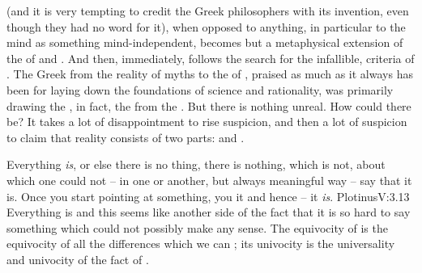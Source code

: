  (and it is very tempting to credit the Greek philosophers with its
invention, even though they had no word for it), when opposed to anything, in
particular to the 
mind as something mind-independent,
becomes but a metaphysical extension of the  
of  and .
And then, immediately, follows the search for the infallible, 
criteria of .  The Greek  from the reality of myths to
the  of , praised as much as it always has
been for laying down the foundations of science and rationality, was primarily
drawing the , in fact,  the  from the
.  But there is nothing unreal. How could there be? It takes a lot
of disappointment to rise suspicion, and then a lot of suspicion to claim that
reality consists of two parts:  and .

Everything {\em is}, or else there is no thing, there is nothing,
which is not, about which one could not -- in one or another, but always
meaningful way -- say that it is.  Once you start pointing at something, you
 it and hence -- it {\em is}.  \citet{Being itself is manifold
  within itself, and whatever else you may name has Being.}{Plotinus}{V:3.13}
Everything is and this seems like another side of the fact that it is so hard to
say something which could not possibly make any sense.  The equivocity of  is the equivocity of all the differences which we can ;
its univocity is the universality and univocity of the fact of .





